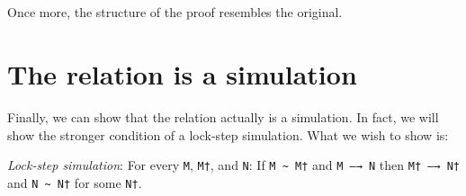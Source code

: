 \begin{fence}
\begin{code}
\AgdaSpace{}%
\AgdaSpace{}%
\AgdaSymbol{=}\AgdaSpace{}%
\AgdaSpace{}%
\AgdaSymbol{\{}\AgdaSpace{}%
\AgdaOperator{\AgdaInductiveConstructor{,}}\AgdaSpace{}%
\AgdaSymbol{\}}\AgdaSpace{}%
\AgdaSymbol{\{}\AgdaSymbol{\}}\AgdaSpace{}%
\AgdaSpace{}%
\AgdaSymbol{\{}\AgdaSymbol{\}}\AgdaSpace{}%
\<%
\\
\>[0][@{}l@{\AgdaIndent{0}}]%
\>[2]\<%
\\
%
\>[2]\AgdaSpace{}%
\AgdaSymbol{:}\AgdaSpace{}%
\AgdaSpace{}%
\AgdaSymbol{\{}\AgdaSymbol{\}}\AgdaSpace{}%
\AgdaSpace{}%
\AgdaSymbol{(}\AgdaSpace{}%
\AgdaSymbol{:}\AgdaSpace{}%
\AgdaSpace{}%
\AgdaOperator{\AgdaInductiveConstructor{,}}\AgdaSpace{}%
\AgdaSpace{}%
\AgdaSpace{}%
\AgdaSymbol{)}\AgdaSpace{}%
\AgdaSpace{}%
\AgdaSymbol{\AgdaUnderscore{}}\AgdaSpace{}%
\AgdaOperator{\AgdaDatatype{\textasciitilde{}}}\AgdaSpace{}%
\AgdaSymbol{\AgdaUnderscore{}}\<%
\\
%
\>[2]\AgdaSpace{}%
%
\>[12]\AgdaSymbol{=}%
\>[15]\<%
\\
%
\>[2]\AgdaSpace{}%
\AgdaSymbol{(}\AgdaSpace{}%
\AgdaSymbol{)}%
\>[12]\AgdaSymbol{=}%
\>[15]\<%
\end{code}
\end{fence}

Once more, the structure of the proof resembles the original.

\hypertarget{the-relation-is-a-simulation}{%
\section{The relation is a
simulation}\label{the-relation-is-a-simulation}}

Finally, we can show that the relation actually is a simulation. In
fact, we will show the stronger condition of a lock-step simulation.
What we wish to show is:

\emph{Lock-step simulation}: For every \texttt{M}, \texttt{M†}, and
\texttt{N}: If \texttt{M\ \textasciitilde{}\ M†} and \texttt{M\ —→\ N}
then \texttt{M†\ —→\ N†} and \texttt{N\ \textasciitilde{}\ N†} for some
\texttt{N†}.

